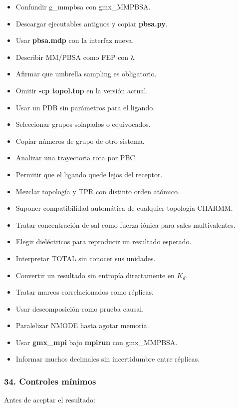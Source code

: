 \documentclass[
  spanish,
  11pt,
  a4paper]{article}
\providecommand{\tightlist}{%
  \setlength{\itemsep}{0pt}\setlength{\parskip}{0pt}}
\begin{document}
\begin{itemize}
\tightlist
\item
  Confundir g\_mmpbsa con gmx\_MMPBSA.
\item
  Descargar ejecutables antiguos y copiar \textbf{pbsa.py}.
\item
  Usar \textbf{pbsa.mdp} con la interfaz nueva.
\item
  Describir MM/PBSA como FEP con λ.
\item
  Afirmar que umbrella sampling es obligatorio.
\item
  Omitir \textbf{-cp topol.top} en la versión actual.
\item
  Usar un PDB sin parámetros para el ligando.
\item
  Seleccionar grupos solapados o equivocados.
\item
  Copiar números de grupo de otro sistema.
\item
  Analizar una trayectoria rota por PBC.
\item
  Permitir que el ligando quede lejos del receptor.
\item
  Mezclar topología y TPR con distinto orden atómico.
\item
  Suponer compatibilidad automática de cualquier topología CHARMM.
\item
  Tratar concentración de sal como fuerza iónica para sales
  multivalentes.
\item
  Elegir dieléctricos para reproducir un resultado esperado.
\item
  Interpretar TOTAL sin conocer sus unidades.
\item
  Convertir un resultado sin entropía directamente en \(K_d\).
\item
  Tratar marcos correlacionados como réplicas.
\item
  Usar descomposición como prueba causal.
\item
  Paralelizar NMODE hasta agotar memoria.
\item
  Usar \textbf{gmx\_mpi} bajo \textbf{mpirun} con gmx\_MMPBSA.
\item
  Informar muchos decimales sin incertidumbre entre réplicas.
\end{itemize}

\subsubsection{34. Controles mínimos}\label{controles-muxednimos}

Antes de aceptar el resultado:
\end{document}
